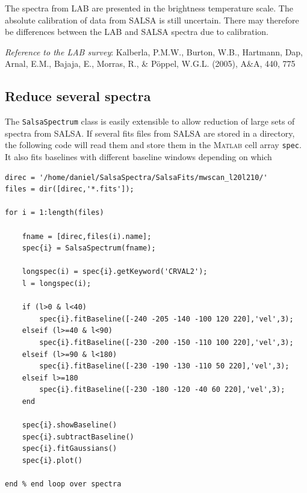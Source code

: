 \documentclass[11pt,a4paper]{article}
\begin{document}
The spectra from LAB are presented in the brightness temperature
scale. The absolute calibration of data from SALSA is still
uncertain. There may therefore be differences between the LAB and
SALSA spectra due to calibration. 

\emph{Reference to the LAB survey}: Kalberla, P.M.W., Burton, W.B.,
Hartmann, Dap, Arnal, E.M., Bajaja, E., Morras, R., \& P\"{o}ppel,
W.G.L. (2005), A\&A, 440, 775


\subsection{Reduce several spectra}
\label{sec:reduce-sever-spectra}

The \texttt{SalsaSpectrum} class is easily extensible to allow
reduction of large sets of spectra from SALSA. If several fits files
from SALSA are stored in a directory, the following code will read
them and store them in the \textsc{Matlab} cell array \texttt{spec}. It also
fits baselines with different baseline windows depending on which 


\begin{lstlisting}
direc = '/home/daniel/SalsaSpectra/SalsaFits/mwscan_l20l210/'
files = dir([direc,'*.fits']);

for i = 1:length(files)

    fname = [direc,files(i).name];
    spec{i} = SalsaSpectrum(fname);
    
    longspec(i) = spec{i}.getKeyword('CRVAL2');
    l = longspec(i);
        
    if (l>0 & l<40)
        spec{i}.fitBaseline([-240 -205 -140 -100 120 220],'vel',3);
    elseif (l>=40 & l<90)
        spec{i}.fitBaseline([-230 -200 -150 -110 100 220],'vel',3);
    elseif (l>=90 & l<180)
        spec{i}.fitBaseline([-230 -190 -130 -110 50 220],'vel',3);
    elseif l>=180
        spec{i}.fitBaseline([-230 -180 -120 -40 60 220],'vel',3);        
    end
    
    spec{i}.showBaseline()    
    spec{i}.subtractBaseline()
    spec{i}.fitGaussians()
    spec{i}.plot()  

end % end loop over spectra
\end{lstlisting}


\newpage
\end{document}
